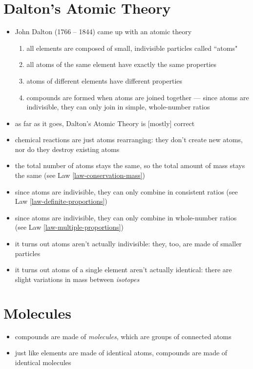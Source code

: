 \documentclass[11pt, oneside]{article}   	%
\begin{document}
\section{Dalton's Atomic Theory}
\begin{itemize}
\item John Dalton (1766 -- 1844) came up with an atomic theory\cite[p. 83--85]{wile-chem-2}
\begin{enumerate}
\item all elements are composed of small, indivisible particles called ``atoms"
\item all atoms of the same element have exactly the same properties
\item atoms of different elements have different properties
\item compounds are formed when atoms are joined together --- since atoms are indivisible, they can only join in simple, whole-number ratios
\end{enumerate}
\item as far as it goes, Dalton's Atomic Theory is [mostly] correct
\item chemical reactions are just atoms rearranging: they don't create new atoms, nor do they destroy existing atoms
\item the total number of atoms stays the same, so the total amount of mass stays the same (see Law \ref{law-conservation-mass})
\item since atoms are indivisible, they can only combine in consistent ratios (see Law \ref{law-definite-proportions})
\item since atoms are indivisible, they can only combine in whole-number ratios (see Law \ref{law-multiple-proportions})
\item it turns out atoms aren't actually indivisible: they, too, are made of smaller particles\cite[p. 85]{wile-chem-2}
\item it turns out atoms of a single element aren't actually identical: there are slight variations in mass between \emph{isotopes}\cite[p. 85]{wile-chem-2}
\end{itemize}


\section{Molecules}
\begin{itemize}
\item compounds are made of \emph{molecules}, which are groups of connected atoms
\item just like elements are made of identical atoms, compounds are made of identical molecules
\end{itemize}
\end{document}
